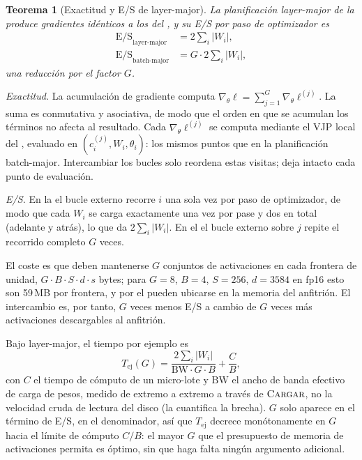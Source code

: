 \documentclass[journal]{IEEEtran}
\newtheorem{theorem}{Teorema}
\begin{document}
\begin{theorem}[Exactitud y E/S de layer-major]
\label{thm:lm}
La planificación layer-major de la  produce gradientes idénticos a los del
, y su E/S por paso de optimizador es
\begin{align}
\mathrm{E/S}_{\text{layer-major}} &= 2\sum_i |W_i| , \\
\mathrm{E/S}_{\text{batch-major}} &= G \cdot 2\sum_i |W_i| ,
\end{align}
una reducción por el factor $G$.
\end{theorem}

\begin{IEEEproof}
\emph{Exactitud.} La acumulación de gradiente computa
$\nabla_\theta \ell = \sum_{j=1}^{G} \nabla_\theta \ell^{(j)}$. La suma es conmutativa y
asociativa, de modo que el orden en que se acumulan los términos no afecta al resultado. Cada
$\nabla_\theta \ell^{(j)}$ se computa mediante el VJP local del , evaluado en
$(c_i^{(j)}, W_i, \theta_i)$: los mismos puntos que en la planificación batch-major. Intercambiar
los bucles solo reordena estas visitas; deja intacto cada punto de evaluación.

\emph{E/S.} En la  el bucle externo recorre $i$ una sola vez por paso de optimizador,
de modo que cada $W_i$ se carga exactamente una vez por pase y dos en total (adelante y atrás), lo
que da $2\sum_i |W_i|$. En el  el bucle externo sobre $j$ repite el recorrido
completo $G$ veces.
\end{IEEEproof}

El coste es que deben mantenerse $G$ conjuntos de activaciones en cada frontera de unidad,
$G \cdot B \cdot S \cdot d \cdot s$ bytes; para $G=8$, $B=4$, $S=256$, $d=3584$ en fp16 esto son
59\,MB por frontera, y por el  pueden ubicarse en la memoria del anfitrión. El
intercambio es, por tanto, $G$ veces menos E/S a cambio de $G$ veces más activaciones descargables al anfitrión.

Bajo layer-major, el tiempo por ejemplo es
\begin{equation}
\label{eq:choiceG}
T_{\text{ej}}(G) = \frac{2\sum_i |W_i|}{\mathrm{BW}\cdot G\cdot B} + \frac{C}{B},
\end{equation}
con $C$ el tiempo de cómputo de un micro-lote y $\mathrm{BW}$ el ancho de banda efectivo de carga
de pesos, medido de extremo a extremo a través de $\textsc{Cargar}$, no la velocidad cruda de
lectura del disco (la  cuantifica la brecha). $G$ solo aparece en el término de E/S,
en el denominador, así que $T_{\text{ej}}$ decrece monótonamente en $G$ hacia el límite de cómputo
$C/B$: el mayor $G$ que el presupuesto de memoria de activaciones permita es óptimo, sin que haga
falta ningún argumento adicional.
\end{document}
